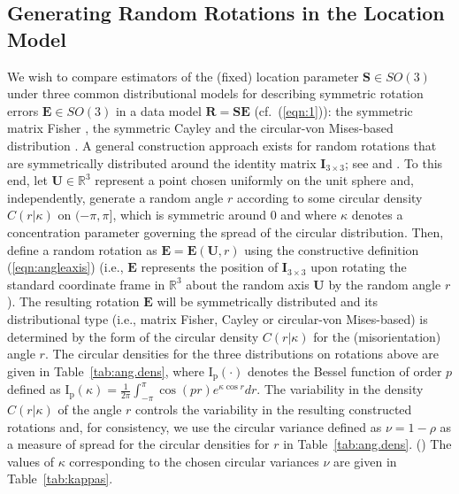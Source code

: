 \subsection{Generating Random Rotations in the Location Model}
\label{subsec:genRR}
We wish to compare estimators of the (fixed) location parameter $\bm{S}\in SO(3)$ under three common distributional models for describing symmetric rotation errors $\bm{E}\in SO(3)$ in a data model  $\bm{R}=\bm{S}\bm{E}$ (cf.~(\ref{eqn:1})): the symmetric matrix Fisher \citep{langevin05, downs72, khatri77, jupp79}, the symmetric Cayley  \citep{Schaeben97, leon06} and the circular-von Mises-based distribution \citep{bingham09}. A general construction approach exists for random rotations that are symmetrically distributed around the identity matrix $\bm{I}_{3 \times 3}$; see \cite{watson83, bingham09} and \cite{hielscher10}.  To this end, let $\bm{U}\in\mathbb{R}^3$ represent a point chosen uniformly on the unit sphere and, independently, generate a random angle $r$ according to some circular density $C(r|\kappa)$ on $(-\pi,\pi]$, which is symmetric around 0 and where $\kappa$ denotes a concentration parameter governing the spread of the circular distribution.  Then, define a random rotation as $\bm{E}=\bm{E}(\bm{U},r)$ using the constructive definition (\ref{eqn:angleaxis}) (i.e., $\bm{E}$ represents the position of $\bm{I}_{3\times 3}$ upon rotating the standard coordinate frame in $\mathbb{R}^3$ about the random axis $\bm{U}$ by the random angle $r$). The resulting rotation $\bm{E}$ will be symmetrically distributed and its distributional type (i.e., matrix Fisher, Cayley or circular-von Mises-based) is determined by the form of the circular density $C(r|\kappa)$ for the (misorientation) angle $r$. The circular densities  for the three distributions on rotations above are given in Table~\ref{tab:ang.dens}, where $\mathrm{I_p}(\cdot)$ denotes the Bessel function of order $p$ defined as  $\mathrm{I_p}(\kappa)=\frac{1}{2\pi}\int_{-\pi}^{\pi}\cos(pr)e^{\kappa\cos r}dr$.  The variability in the density $C(r|\kappa)$ of the angle $r$ controls the variability in the resulting constructed rotations and, for consistency, we use the circular variance defined as $\nu=1-\rho$ as a measure of spread for the circular densities for $r$ in Table~\ref{tab:ang.dens}.  () The values of $\kappa$ corresponding to the chosen circular variances $\nu$ are given in Table~\ref{tab:kappas}.

